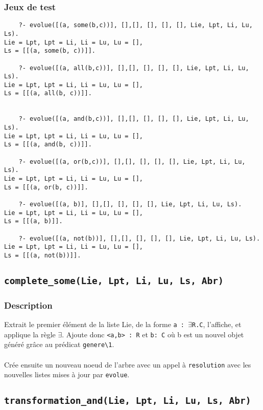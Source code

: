 \documentclass{article}
\newcommand{\code}[1]{\colorbox{light-gray}{\texttt{#1}}}
\begin{document}
 \subsubsection{Jeux de test}

\begin{verbatim}
    ?- evolue([(a, some(b,c))], [],[], [], [], [], Lie, Lpt, Li, Lu, Ls).
Lie = Lpt, Lpt = Li, Li = Lu, Lu = [],
Ls = [[(a, some(b, c))]].

    ?- evolue([(a, all(b,c))], [],[], [], [], [], Lie, Lpt, Li, Lu, Ls).
Lie = Lpt, Lpt = Li, Li = Lu, Lu = [],
Ls = [[(a, all(b, c))]].


    ?- evolue([(a, and(b,c))], [],[], [], [], [], Lie, Lpt, Li, Lu, Ls).
Lie = Lpt, Lpt = Li, Li = Lu, Lu = [],
Ls = [[(a, and(b, c))]].

    ?- evolue([(a, or(b,c))], [],[], [], [], [], Lie, Lpt, Li, Lu, Ls).
Lie = Lpt, Lpt = Li, Li = Lu, Lu = [],
Ls = [[(a, or(b, c))]].

    ?- evolue([(a, b)], [],[], [], [], [], Lie, Lpt, Li, Lu, Ls).
Lie = Lpt, Lpt = Li, Li = Lu, Lu = [],
Ls = [[(a, b)]].

    ?- evolue([(a, not(b))], [],[], [], [], [], Lie, Lpt, Li, Lu, Ls).
Lie = Lpt, Lpt = Li, Li = Lu, Lu = [],
Ls = [[(a, not(b))]].
\end{verbatim}
 
\subsection{\code{complete\_some(Lie, Lpt, Li, Lu, Ls, Abr)}}

\subsubsection{Description}
Extrait le premier élément de la liste Lie, de la forme \code{a : $\exists$R.C}, l'affiche, et applique la règle $\exists$. Ajoute donc \code{<a,b> : R} et \code{b: C} où b est un nouvel objet généré grâce au prédicat \code{genere\textbackslash1}.
\\\\
Crée ensuite un nouveau noeud de l'arbre avec un appel à \code{resolution} avec les nouvelles listes mises à jour par \code{evolue}.

\subsection{\code{transformation\_and(Lie, Lpt, Li, Lu, Ls, Abr)}}
\end{document}
